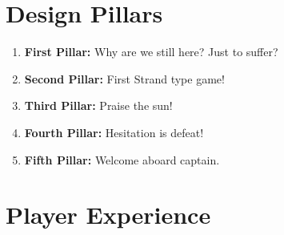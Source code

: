 \section{Design Pillars}

\begin{enumerate}
	\item \textbf{First Pillar:} Why are we still here? Just to suffer?
	\item \textbf{Second Pillar:} First Strand type game!
	\item \textbf{Third Pillar:} Praise the sun!
	\item \textbf{Fourth Pillar:} Hesitation is defeat!
	\item \textbf{Fifth Pillar:} Welcome aboard captain.
\end{enumerate}

\lipsum[4]

\section{Player Experience}

\lipsum[5] \cite{WikiFlow}

\lipsum[6] \cite{WikiLudonarrative, WikiGameDesign}